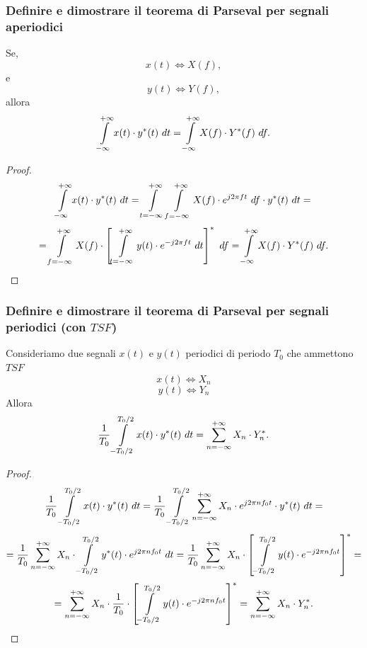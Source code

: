\documentclass[12pt,oneside,openany]{memoir}
\numberwithin{equation}{subsection}
\newcommand{\dt}{\ dt}
\newcommand{\df}{\ df}
\begin{document}

\subsubsection{Definire e dimostrare il teorema di Parseval per segnali
aperiodici}
Se,
\[
    x(t) \iff X(f),
\]
e
\[
    y(t) \iff Y(f),
\]
allora
\[
    \int\displaylimits_{-\infty}^{+\infty} x(t) \cdot y^*(t) \dt =
    \int\displaylimits_{-\infty}^{+\infty} X(f) \cdot Y^*(f) \df.
\]
\begin{proof}
\[
    \int\displaylimits_{-\infty}^{+\infty} x(t) \cdot y^*(t) \dt =
    \int\displaylimits_{t = -\infty}^{+\infty}
    \int\displaylimits_{f = -\infty}^{+\infty} X(f) \cdot e^{j 2 \pi f t}
    \df \cdot y^*(t) \dt =
\]
\[
    = \int\displaylimits_{f = -\infty}^{+\infty} X(f) \cdot \left[
        \int\displaylimits_{t = -\infty}^{+\infty} y(t) \cdot e^{-j 2 \pi f t}
        \dt
    \right]^* \df = \int\displaylimits_{-\infty}^{+\infty} X(f) \cdot Y^*(f) \df
    .
\]
\end{proof}


\subsubsection{Definire e dimostrare il teorema di Parseval per segnali
periodici (con $TSF$)}
Consideriamo due segnali $x(t)$ e $y(t)$ periodici di periodo $T_0$ che
ammettono $TSF$
\[
    x(t) \iff X_n
\]
\[
    y(t) \iff Y_n
\]
Allora
\[
    \frac{1}{T_0} \int\displaylimits_{-T_0/2}^{T_0/2} x(t) \cdot y^*(t) \dt =
    \sum\displaylimits_{n = -\infty}^{+\infty} X_n \cdot Y^*_n.
\]
\begin{proof}
\[
    \frac{1}{T_0} \int\displaylimits_{-T_0/2}^{T_0/2} x(t) \cdot y^*(t) \dt =
    \frac{1}{T_0} \int\displaylimits_{-T_0/2}^{T_0/2}
    \sum\displaylimits_{n = -\infty}^{+\infty} X_n \cdot e^{j 2 \pi n f_0 t}
    \cdot y^*(t) \dt =
\]
\[
    = \frac{1}{T_0} \sum\displaylimits_{n = -\infty}^{+\infty} X_n \cdot
    \int\displaylimits_{-T_0/2}^{T_0/2} y^*(t) \cdot e^{j 2 \pi n f_0 t} \dt =
    \frac{1}{T_0} \sum\displaylimits_{n = -\infty}^{+\infty} X_n \cdot
    \left[
        \int\displaylimits_{-T_0/2}^{T_0/2} y(t) \cdot e^{-j 2 \pi n f_0 t}
    \right]^* =
\]
\[
    = \sum\displaylimits_{n = -\infty}^{+\infty} X_n \cdot
    \frac{1}{T_0} \cdot \left[
        \int\displaylimits_{-T_0/2}^{T_0/2} y(t) \cdot e^{-j 2 \pi n f_0 t}
    \right]^* =
    \sum\displaylimits_{n = -\infty}^{+\infty} X_n \cdot Y^*_n.
\]
\end{proof}
\end{document}
